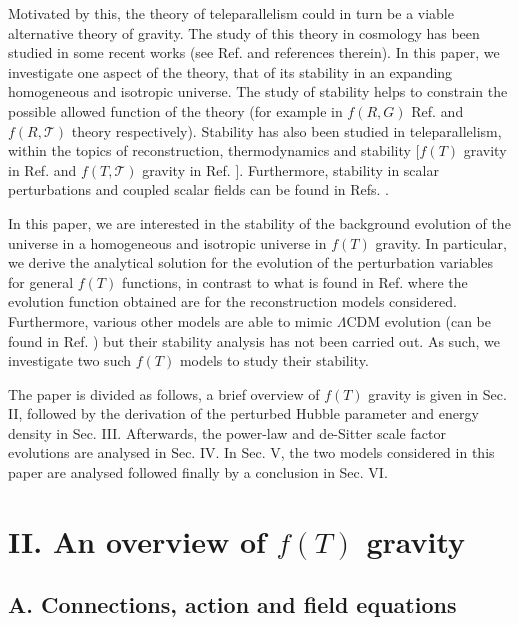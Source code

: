 \documentclass[prl,floatfix,showpacs,twocolumn,preprintnumbers,amsmath,amssymb,superscriptaddress]{revtex4}
\begin{document}
Motivated by this, the theory of teleparallelism could in turn be a viable alternative theory of gravity. The study of this theory in cosmology has been studied in some recent works (see Ref. \cite{Cai:2015emx} and references therein). In this paper, we investigate one aspect of the theory, that of its stability in an expanding homogeneous and isotropic universe. The study of stability helps to constrain the possible allowed function of the theory (for example in $f(R,G)$ Ref. \cite{delaCruzDombriz:2011wn} and $f(R,\mathcal{T})$ theory \cite{Sharif:2014ioa} respectively). Stability has also been studied in teleparallelism, within the topics of reconstruction, thermodynamics and stability [$f(T)$ gravity in Ref. \cite{Salako:2013gka} and $f(T,\mathcal{T})$ gravity in Ref. \cite{Junior:2015bva}]. Furthermore, stability in scalar perturbations and coupled scalar fields can be found in Refs. \cite{Harko:2014aja,Biswas:2015cva}. 

In this paper, we are interested in the stability of the background evolution of the universe in a homogeneous and isotropic universe in $f(T)$ gravity. In particular, we derive the analytical solution for the evolution of the perturbation variables for general $f(T)$ functions, in contrast to what is found in Ref. \cite{Salako:2013gka} where the evolution function obtained are for the reconstruction models considered. Furthermore, various other models are able to mimic $\Lambda$CDM evolution (can be found in Ref. \cite{Nesseris:2013jea}) but their stability analysis has not been carried out. As such, we investigate two such $f(T)$ models to study their stability.

The paper is divided as follows, a brief overview of $f(T)$ gravity is given in Sec. II, followed by the derivation of the perturbed Hubble parameter and energy density in Sec. III. Afterwards, the power-law and de-Sitter scale factor evolutions are analysed in Sec. IV. In Sec. V, the two models considered in this paper are analysed followed finally by a conclusion in Sec. VI.

\section{II. An overview of $f(T)$ gravity}\label{sec:field-equations}

\subsection{A. Connections, action and field equations}
\end{document}
